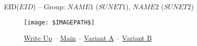 \begin{frame}
{\tiny EID($EID$) -- Group: $NAME1$ ($SUNET1$), $NAME2$ ($SUNET2$)}
\begin{figure}
\texttt{[image: \$IMAGEPATH\$]}
\caption{\href{$WRITEUPURL$}{Write Up} -- 
    \href{$MAINURL$}{Main} -- 
    \href{$VARAURL$}{Variant A} --
    \href{$VARBURL$}{Variant B}}
\end{figure}
\end{frame}


